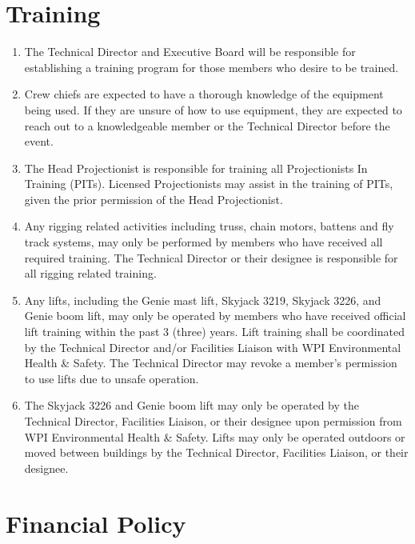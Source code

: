 \documentclass[12pt,letterpaper,oneside]{book}
\begin{document}
\section{Training}

\begin{enumerate}

\item The Technical Director and Executive Board will be responsible for establishing a training program for those members who desire to be trained.
\item Crew chiefs are expected to have a thorough knowledge of the equipment being used. If they are unsure of how to use equipment, they are expected to reach out to a knowledgeable member or the Technical Director before the event.
\item The Head Projectionist is responsible for training all Projectionists In Training (PITs).
Licensed Projectionists may assist in the training of PITs, given the prior permission of the Head Projectionist.
\item Any rigging related activities including truss, chain motors, battens and fly track systems, may only be performed by members who have received all required training. The Technical Director or their designee is responsible for all rigging related training.
\item Any lifts, including the Genie mast lift, Skyjack 3219, Skyjack 3226, and Genie boom lift, may only be operated by members who have received official lift training within the past 3 (three) years. Lift training shall be coordinated by the Technical Director and/or Facilities Liaison with WPI Environmental Health \& Safety. The Technical Director may revoke a member's permission to use lifts due to unsafe operation.
\item The Skyjack 3226 and Genie boom lift may only be operated by the Technical Director, Facilities Liaison, or their designee upon permission from WPI Environmental Health \& Safety. Lifts may only be operated outdoors or moved between buildings by the Technical Director, Facilities Liaison, or their designee.

\end{enumerate}

\section{Financial Policy}
\end{document}
